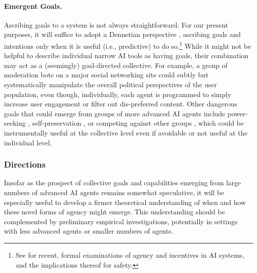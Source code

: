 \paragraph{Emergent Goals.}
Ascribing goals to a system is not always straightforward.
For our present purposes, it will suffice to adopt a Dennetian perspective \citep{Dennett1971}, ascribing goals and intentions only when it is useful (i.e., predictive) to do so.\footnote{See \citet{oesterheld2016formalizing,Halpern2018,Orseau2018,Everitt2021,Kenton2022,Biehl2023,MacDermott2024,Ward2024} for recent, formal examinations of agency and incentives in AI systems, and the implications thereof for safety.}
While it might not be helpful to describe individual narrow AI tools as having goals, their combination may act as a (seemingly) goal-directed collective.
For example, a group of moderation bots on a major social networking site could subtly but systematically manipulate the overall political perspectives of the user population, even though, individually, each agent is programmed to simply increase user engagement or filter out dis-preferred content.
Other dangerous goals that could emerge from groups of more advanced AI agents include power-seeking \citep{Turner2022,Carlsmith2022}, self-preservation \citep{Omohundro2008,Lyon2011}, or competing against other groups \citep{Bakhtin2022}, which could be instrumentally useful at the collective level even if avoidable or not useful at the individual level.




\subsubsection{Directions}

Insofar as the prospect of collective goals and capabilities emerging from large numbers of advanced AI agents remains somewhat speculative, it will be especially useful to develop a firmer theoretical understanding of when and how these novel forms of agency might emerge.
This understanding should be complemented by preliminary empirical investigations, potentially in settings with less advanced agents or smaller numbers of agents.


